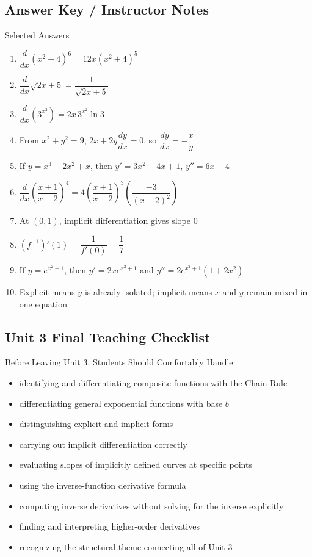 \documentclass[11pt]{article}
\begin{document}
\newpage
\subsection{Answer Key / Instructor Notes}

\begin{summarybox}{Selected Answers}
\begin{enumerate}
    \item $\dfrac{d}{dx}(x^2+4)^6=12x(x^2+4)^5$
    \item $\dfrac{d}{dx}\sqrt{2x+5}=\dfrac{1}{\sqrt{2x+5}}$
    \item $\dfrac{d}{dx}(3^{x^2})=2x\,3^{x^2}\ln 3$
    \item From $x^2+y^2=9$, $2x+2y\dfrac{dy}{dx}=0$, so $\dfrac{dy}{dx}=-\dfrac{x}{y}$
    \item If $y=x^3-2x^2+x$, then $y'=3x^2-4x+1$, $y''=6x-4$
    \item $\dfrac{d}{dx}\left(\dfrac{x+1}{x-2}\right)^4=4\left(\dfrac{x+1}{x-2}\right)^3\left(\dfrac{-3}{(x-2)^2}\right)$
    \item At $(0,1)$, implicit differentiation gives slope $0$
    \item $(f^{-1})'(1)=\dfrac{1}{f'(0)}=\dfrac17$
    \item If $y=e^{x^2+1}$, then $y'=2xe^{x^2+1}$ and $y''=2e^{x^2+1}(1+2x^2)$
    \item Explicit means $y$ is already isolated; implicit means $x$ and $y$ remain mixed in one equation
\end{enumerate}
\end{summarybox}

\newpage
\subsection{Unit 3 Final Teaching Checklist}

\begin{summarybox}{Before Leaving Unit 3, Students Should Comfortably Handle}
\begin{itemize}
    \item identifying and differentiating composite functions with the Chain Rule
    \item differentiating general exponential functions with base $b$
    \item distinguishing explicit and implicit forms
    \item carrying out implicit differentiation correctly
    \item evaluating slopes of implicitly defined curves at specific points
    \item using the inverse-function derivative formula
    \item computing inverse derivatives without solving for the inverse explicitly
    \item finding and interpreting higher-order derivatives
    \item recognizing the structural theme connecting all of Unit 3
\end{itemize}
\end{summarybox}
\end{document}
